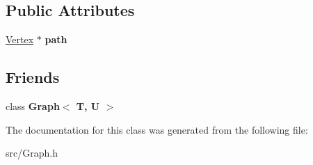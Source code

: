 \subsection*{Public Attributes}
\begin{DoxyCompactItemize}
\item 
\hyperlink{class_vertex}{Vertex} $\ast$ {\bfseries path}\hypertarget{class_vertex_a6166fbda36ae6a8e1d4fe69423c00e9d}{}\label{class_vertex_a6166fbda36ae6a8e1d4fe69423c00e9d}

\end{DoxyCompactItemize}
\subsection*{Friends}
\begin{DoxyCompactItemize}
\item 
class {\bfseries Graph$<$ T, U $>$}\hypertarget{class_vertex_a3a700cfc5d314381d768caf37b1108b9}{}\label{class_vertex_a3a700cfc5d314381d768caf37b1108b9}

\end{DoxyCompactItemize}


The documentation for this class was generated from the following file\+:\begin{DoxyCompactItemize}
\item 
src/Graph.\+h\end{DoxyCompactItemize}
